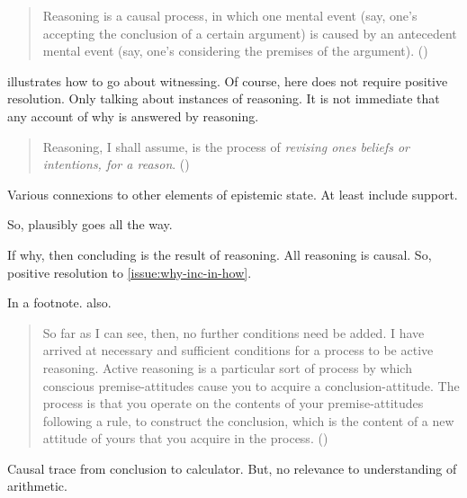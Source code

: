 \begin{note}[Wedgwood]
  \begin{quote}
    Reasoning is a causal process, in which one mental event (say, one's accepting the conclusion of a certain argument) is caused by an antecedent mental event (say, one's considering the premises of the argument).%
    \mbox{}\hfill\mbox{(\cite[660]{Wedgwood:2006ui})}
  \end{quote}

  \citeauthor{Wedgwood:2006ui} illustrates how to go about witnessing.
  Of course, \citeauthor{Wedgwood:2006ui} here does not require positive resolution.
  Only talking about instances of reasoning.
  It is not immediate that any account of why is answered by reasoning.

  \begin{quote}
    Reasoning, I shall assume, is the process of \emph{revising ones beliefs or intentions, for a reason}.%
    \mbox{}\hfill\mbox{(\citeyear[660]{Wedgwood:2006ui})}
  \end{quote}

  Various connexions to other elements of epistemic state.
  At least include support.

  So, plausibly goes all the way.

  If why, then concluding is the result of reasoning.
  All reasoning is causal.
  So, positive resolution to \autoref{issue:why-inc-in-how}.
\end{note}

\begin{note}[Broome]
  {
    \color{red}
    In a footnote.
  }
  \citeauthor{Broome:2013aa} also.
  \begin{quote}
    So far as I can see, then, no further conditions need be added.
    I have arrived at necessary and sufficient conditions for a process to be active reasoning.
    Active reasoning is a particular sort of process by which conscious premise-attitudes cause you to acquire a conclusion-attitude.
    The process is that you operate on the contents of your premise-attitudes following a rule, to construct the conclusion, which is the content of a new attitude of yours that you acquire in the process.%
    \mbox{}\hfill\mbox{(\cite[234]{Broome:2013aa})}
  \end{quote}
\end{note}

\begin{note}[Illustration]
  Causal trace from conclusion to calculator.
  But, no relevance to understanding of arithmetic.
\end{note}

